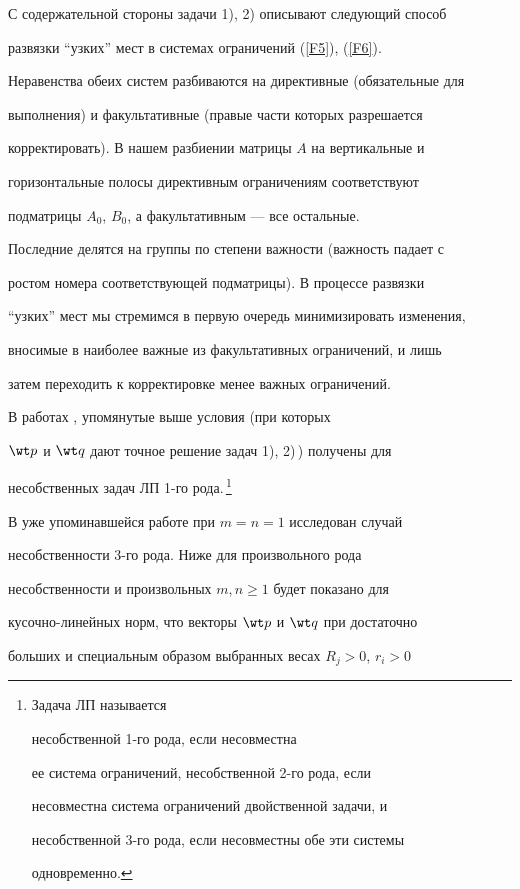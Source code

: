 С содержательной стороны задачи 1), 2) описывают следующий способ


развязки ``узких'' мест в системах ограничений (\ref{F5}), (\ref{F6}).


Неравенства обеих систем разбиваются на директивные (обязательные для


выполнения) и факультативные (правые части которых разрешается


корректировать). В нашем разбиении матрицы $A$ на вертикальные и


горизонтальные полосы директивным ограничениям соответствуют


подматрицы $A_0$, $B_0$, а факультативным --- все остальные.


Последние делятся на группы по степени важности (важность падает с


ростом номера соответствующей подматрицы). В процессе развязки


``узких'' мест мы стремимся в первую очередь минимизировать изменения,


вносимые в наиболее важные из факультативных ограничений, и лишь


затем переходить к корректировке менее важных ограничений.





В работах \cite{13}, \cite{14} упомянутые выше условия (при которых


$\wt p$ и $\wt q$ дают точное решение задач 1), 2)\,) получены для


несобственных задач ЛП 1-го рода.\,\footnote{Задача ЛП называется


несобственной 1-го рода, если несовместна


ее система ограничений, несобственной 2-го рода, если


несовместна система ограничений двойственной задачи, и


несобственной 3-го рода, если несовместны обе эти системы


одновременно.}


В уже упоминавшейся работе \cite{8} при $m=n=1$ исследован случай


несобственности 3-го рода. Ниже для произвольного рода


несобственности и произвольных $m,n\ge 1$ будет показано для


кусочно-линейных норм, что векторы $\wt p$ и $\wt q$ при достаточно


больших и специальным образом выбранных весах $R_j>0$, $r_i>0$


